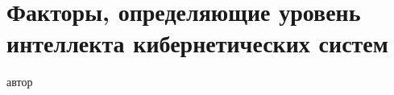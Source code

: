 \chapter{Факторы, определяющие уровень интеллекта кибернетических систем}
{\label{chap_intro}}

\vspace{-7\baselineskip}

\begin{SCn}
\begin{scnrelfromlist}{автор}
\end{scnrelfromlist}

\bigskip


\end{SCn}
